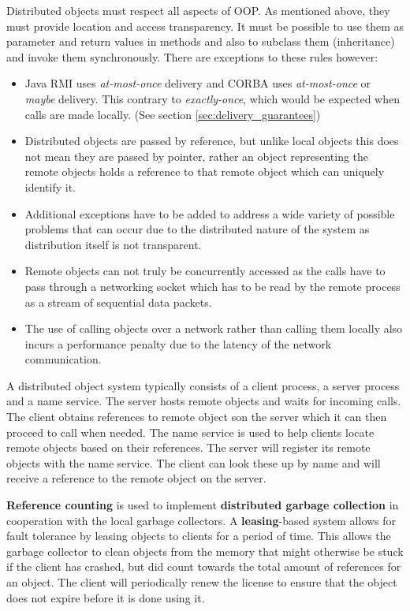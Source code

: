 \documentclass[a4paper]{article}
\begin{document}
Distributed objects must respect all aspects of OOP. As mentioned above, they must provide location and access transparency. It must be possible to use them as parameter and return values in methods and also to subclass them (inheritance) and invoke them synchronously. There are exceptions to these rules however:

\begin{itemize}
\item Java RMI uses \textit{at-most-once} delivery and CORBA uses \textit{at-most-once} or \textit{maybe} delivery. This contrary to \textit{exactly-once}, which would be expected when calls are made locally. (See section \ref{sec:delivery_guarantees})
\item Distributed objects are passed by reference, but unlike local objects this does not mean they are passed by pointer, rather an object representing the remote objects holds a reference to that remote object which can uniquely identify it.
\item Additional exceptions have to be added to address a wide variety of possible problems that can occur due to the distributed nature of the system as distribution itself is not transparent.
\item Remote objects can not truly be concurrently accessed as the calls have to pass through a networking socket which has to be read by the remote process as a stream of sequential data packets.
\item The use of calling objects over a network rather than calling them locally also incurs a performance penalty due to the latency of the network communication.
\end{itemize}

A distributed object system typically consists of a client process, a server process and a name service. The server hosts remote objects and waits for incoming calls. The client obtains references to remote object son the server which it can then proceed to call when needed. The name service is used to help clients locate remote objects based on their references. The server will register its remote objects with the name service. The client can look these up by name and will receive a reference to the remote object on the server.

\textbf{Reference counting} is used to implement \textbf{distributed garbage collection} in cooperation with the local garbage collectors. A \textbf{leasing}-based system allows for fault tolerance by leasing objects to clients for a period of time. This allows the garbage collector to clean objects from the memory that might otherwise be stuck if the client has crashed, but did count towards the total amount of references for an object. The client will periodically renew the license to ensure that the object does not expire before it is done using it.
\end{document}
